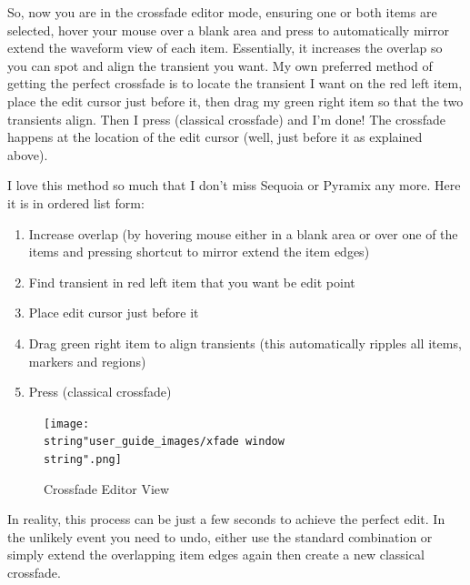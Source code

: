 \documentclass[10pt,american]{article}
\begin{document}
So, now you are in the crossfade editor mode, ensuring one or both items are
selected, hover your mouse over a blank area and press  to automatically
mirror extend the waveform view of each item. Essentially, it increases the
overlap so you can spot and align the transient you want. My own preferred
method of getting the perfect crossfade is to locate the transient I want on the
red left item, place the edit cursor just before it, then drag my green right
item so that the two transients align. Then I press  (classical
crossfade) and I'm done! The crossfade happens at the location of the edit
cursor (well, just before it as explained above). 

I love this method so much that I don't miss Sequoia or Pyramix any more. Here
it is in ordered list form:
\begin{enumerate}
\item Increase overlap (by hovering mouse either in a blank area or over one of
the items and pressing  shortcut to mirror extend the item edges)
\item Find transient in red left item that you want be edit point
\item Place edit cursor just before it
\item Drag green right item to align transients (this automatically ripples all
items, markers and regions)
\item Press  (classical crossfade)
\end{enumerate}
\begin{figure}
\texttt{[image: \\string"user\_guide\_images/xfade window\\string".png]}

\caption{Crossfade Editor View}

\end{figure}

In reality, this process can be just a few seconds to achieve the perfect edit.
In the unlikely event you need to undo, either use the standard 
combination or simply extend the overlapping item edges again then create a new
classical crossfade.
\end{document}
